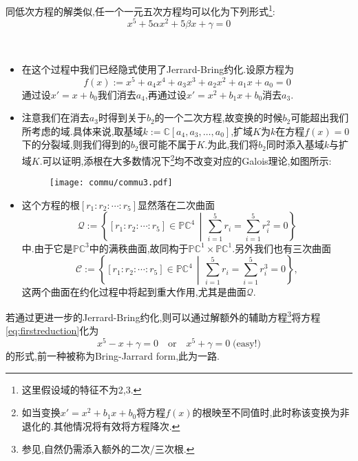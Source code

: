 同低次方程的解类似,任一个一元五次方程均可以化为下列形式\footnote{这里假设域的特征不为2,3.}:
\begin{equation}\label{eq:firstreduction}
x^5+5\alpha x^2+5 \beta x+\gamma=0
\end{equation}
\begin{remarks}\
	\begin{itemize}
		\item 在这个过程中我们已经隐式使用了Jerrard-Bring约化.设原方程为
		$$f(x):=x^5+a_4x^4+a_3x^3+a_2x^2+a_1x+a_0=0$$
		通过设$x'=x+b_0$我们消去$a_4$,再通过设$x'=x^2+b_1x+b_0$消去$a_3$.
		\item 注意我们在消去$a_3$时得到关于$b_2$的一个二次方程,故变换的时候$b_2$可能超出我们所考虑的域.具体来说,取基域$k:=\mathbb{C}[a_4,a_3,\ldots,a_0]$,扩域$K$为$k$在方程$f(x)=0$下的分裂域,则我们得到的$b_2$很可能不属于$K$.为此,我们将$b_2$同时添入基域$k$与扩域$K$.可以证明,添根在大多数情况下\footnote{如当变换$x'=x^2+b_1x+b_0$将方程$f(x)$的根映至不同值时,此时称该变换为非退化的.其他情况将有效将方程降次.}均不改变对应的Galois理论,如图所示:
		
		\begin{figure}[ht]
			
			\begin{minipage}[t]{.9\textwidth}
				\vspace{0.1cm}
				\centering
				\texttt{[image: commu/commu3.pdf]}
				
			\end{minipage}
			\label{pic:galois}
		\end{figure}
		
		
		\item 这个方程的根$[r_1:r_2:\cdots:r_5]$显然落在二次曲面
		$$\mathcal{Q}:=\left\{[r_1:r_2:\cdots:r_5] \in \mathbb{PC}^4 \,\middle|\, \sum_{i=1}^{5}r_i=\sum_{i=1}^{5}r_i^2=0 \right\}$$
		中.由于它是$\mathbb{PC}^3$中的满秩曲面,故同构于$\mathbb{PC}^1 \times \mathbb{PC}^1$.另外我们也有三次曲面
		$$\mathcal{C}:=\left\{[r_1:r_2:\cdots:r_5] \in \mathbb{PC}^4 \,\middle|\, \sum_{i=1}^{5}r_i=\sum_{i=1}^{5}r_i^3=0 \right\},$$
		这两个曲面在约化过程中将起到重大作用,尤其是曲面$\mathcal{Q}$.
	\end{itemize}
\end{remarks}

若通过更进一步的Jerrard-Bring约化,则可以通过解额外的辅助方程\footnote{参见\cite{green1978on},自然仍需添入额外的二次/三次根.}将方程\eqref{eq:firstreduction}化为
$$x^5-x+\gamma=0 \quad \text{or} \quad x^5+\gamma=0\;\text{(easy!)}$$
的形式,前一种被称为Bring-Jarrard form,此为一路.

